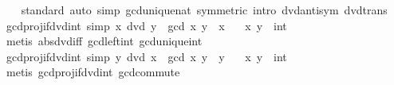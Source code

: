 \begin{isabellebody}
%
\isadelimproof
\ \ %
\endisadelimproof
%
\isatagproof
{}\isamarkupfalse%
\ standard\ {\isacharparenleft}{\kern0pt}auto\ simp{\isacharcolon}{\kern0pt}\ gcd{\isacharunderscore}{\kern0pt}unique{\isacharunderscore}{\kern0pt}nat\ {\isacharbrackleft}{\kern0pt}symmetric{\isacharbrackright}{\kern0pt}\ intro{\isacharcolon}{\kern0pt}\ dvd{\isacharunderscore}{\kern0pt}antisym\ dvd{\isacharunderscore}{\kern0pt}trans{\isacharparenright}{\kern0pt}%
\endisatagproof
{\isafoldproof}%
%
\isadelimproof
\isanewline
%
\endisadelimproof
\isanewline
{}\isamarkupfalse%
\ gcd{\isacharunderscore}{\kern0pt}proj{}{\isacharunderscore}{\kern0pt}if{\isacharunderscore}{\kern0pt}dvd{\isacharunderscore}{\kern0pt}int\ {\isacharbrackleft}{\kern0pt}simp{\isacharbrackright}{\kern0pt}{\isacharcolon}{\kern0pt}\ {\isachardoublequoteopen}x\ dvd\ y\ {\isasymLongrightarrow}\ gcd\ x\ y\ {\isacharequal}{\kern0pt}\ {\isasymbar}x{\isasymbar}{\isachardoublequoteclose}\isanewline
\ \ \ x\ y\ {\isacharcolon}{\kern0pt}{\isacharcolon}{\kern0pt}\ int\isanewline
%
\isadelimproof
\ \ %
\endisadelimproof
%
\isatagproof
{}\isamarkupfalse%
\ {\isacharparenleft}{\kern0pt}metis\ abs{\isacharunderscore}{\kern0pt}dvd{\isacharunderscore}{\kern0pt}iff\ gcd{\isacharunderscore}{\kern0pt}{}{\isacharunderscore}{\kern0pt}left{\isacharunderscore}{\kern0pt}int\ gcd{\isacharunderscore}{\kern0pt}unique{\isacharunderscore}{\kern0pt}int{\isacharparenright}{\kern0pt}%
\endisatagproof
{\isafoldproof}%
%
\isadelimproof
\isanewline
%
\endisadelimproof
\isanewline
{}\isamarkupfalse%
\ gcd{\isacharunderscore}{\kern0pt}proj{}{\isacharunderscore}{\kern0pt}if{\isacharunderscore}{\kern0pt}dvd{\isacharunderscore}{\kern0pt}int\ {\isacharbrackleft}{\kern0pt}simp{\isacharbrackright}{\kern0pt}{\isacharcolon}{\kern0pt}\ {\isachardoublequoteopen}y\ dvd\ x\ {\isasymLongrightarrow}\ gcd\ x\ y\ {\isacharequal}{\kern0pt}\ {\isasymbar}y{\isasymbar}{\isachardoublequoteclose}\isanewline
\ \ \ x\ y\ {\isacharcolon}{\kern0pt}{\isacharcolon}{\kern0pt}\ int\isanewline
%
\isadelimproof
\ \ %
\endisadelimproof
%
\isatagproof
{}\isamarkupfalse%
\ {\isacharparenleft}{\kern0pt}metis\ gcd{\isacharunderscore}{\kern0pt}proj{}{\isacharunderscore}{\kern0pt}if{\isacharunderscore}{\kern0pt}dvd{\isacharunderscore}{\kern0pt}int\ gcd{\isachardot}{\kern0pt}commute{\isacharparenright}{\kern0pt}%
\endisatagproof
{\isafoldproof}%
%
\isadelimproof
%
\endisadelimproof
%
\begin{isamarkuptext}%

\end{isamarkuptext}
\end{isabellebody}
